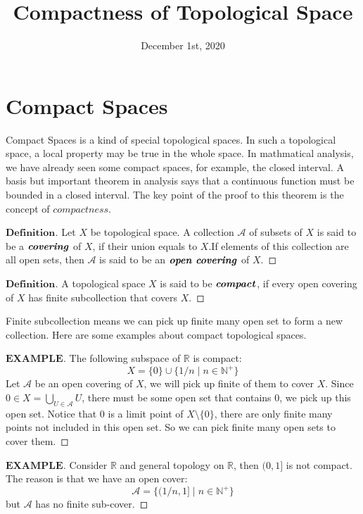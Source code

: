 \documentclass[a4paper, 11pt]{article}
\title{\textbf{Compactness of Topological Space}}
\date{December 1st, 2020}
\theoremstyle{definition}
\theoremstyle{remark}
\newenvironment{mydef}
{\renewcommand\qedsymbol{$ $}\begin{proof}[$\mathbf{Definition}$]}
  {\end{proof}}
\newenvironment{myexam}
{\renewcommand\qedsymbol{$ $}\begin{proof}[$\mathbf{EXAMPLE}$]}
  {\end{proof}}
\theoremstyle{definition}
\begin{document}
\maketitle
\section{Compact Spaces} 

\indent Compact Spaces is a kind of special topological spaces. In such a
topological space, a local property may be true in the whole space. In mathmatical
analysis, we have already seen some compact spaces, for example, the closed 
interval. A basis but important theorem in analysis says that a continuous 
function must be bounded in a closed interval. The key point of the proof to
this theorem is the concept of $\textit{compactness}$.
\vspace{0.5cm}
\begin{mydef}
        Let $X$ be topological space. A collection $\mathcal{A}$ of subsets of
        $X$ is said to be a $\textbf{\textit{covering}}$ of $X$, if their
        union equals to $X$.If elements of this collection are
        all open sets, then $\mathcal{A}$ is said to be an $\textbf{\textit{open
        covering}}$ of $X$.
\end{mydef}
\vspace{0.5cm}
\begin{mydef}
        A topological space $X$ is said to be $\textbf{\textit{compact}}$, 
        if every open covering of $X$ has finite subcollection that covers $X$.
\end{mydef}
Finite subcollection means we can pick up finite many open set to form a
new collection. Here are some examples about compact topological spaces.
\begin{myexam}
       The following subspace of $\mathbb{R}$ is compact:
       $$
       X=\{0\}\cup \{1/n\mid n\in \mathbb{N}^{+}\}
       $$
       \indent Let $\mathcal{A}$ be an open covering of $X$, we will pick up 
       finite of them to cover $X$. Since $\displaystyle
       0\in X=\bigcup_{U\in \mathcal{A}} U$, there must be some open set that
       contains 0, we pick up this open set. Notice that 0 is a limit point of 
       $X\setminus\{0\}$,  there are only finite many points not included in this
       open set. So we can pick finite many open sets to cover them.
\end{myexam}
\begin{myexam}
        Consider $\mathbb{R}$ and general topology on $\mathbb{R}$, then $(0,1]$
        is not compact. The reason is that we have an open cover:
        $$
        \mathcal{A}=\{(1/n,1] \mid n\in \mathbb{N}^{+}\}
        $$ but $\mathcal{A}$ has no finite sub-cover.
\end{myexam}
\end{document}
